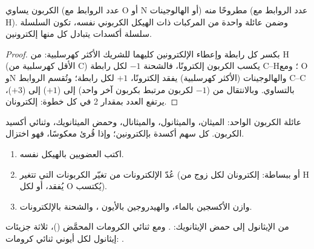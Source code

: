 \begin{proposition}\label{prop:b1:organic-redox:on-of-carbon}
 الكربون يساوي (عدد الروابط مع O أو N أو
الهالوجينات) مطروحًا منه (عدد الروابط مع H). وضمن عائلة واحدة من المركبات
ذات الهيكل الكربوني نفسه، تكون السلسلة  سلسلة أكسدات يتبادل كل منها
إلكترونين.
\end{proposition}

\begin{proof}
بكسر كل رابطة وإعطاء الإلكترونين كليهما للشريك الأكثر
كهرسلبية: من H (الأقل كهرسلبية من C) يكسب الكربون إلكترونًا،
فالشحنة $-1$ لكل رابطة C--H؛ ومع O وN والهالوجينات (الأكثر كهرسلبية) يفقد
إلكترونًا، $+1$ لكل رابطة؛ وتُقسم الروابط C--C بالتساوي. وبالانتقال من 
($-1$ لكربون مرتبط بكربون آخر واحد) إلى  ($+1$) إلى
 ($+3$)، يرتفع العدد بمقدار 2 في كل خطوة: إلكترونان.
\end{proof}

\begin{omfigure}

{\small {} عائلة الكربون الواحد: الميثان، والميثانول،
والميثانال، وحمض الميثانويك، وثنائي أكسيد الكربون. كل سهم أكسدة
بإلكترونين؛ وإذا قُرئ معكوسًا، فهو اختزال.}
\end{omfigure}

\begin{method}\label{met:b1:organic-redox:balance-organic-redox}
\begin{enumerate}
  \item اكتب   العضويين بالهيكل نفسه.
  \item عُدّ الإلكترونات من تغيّر 
        الكربونات التي تتغير (أو ببساطة: إلكترونان لكل زوج من H يُفقد، أو لكل O
        يُكتسب).
  \item وازن الأكسجين بالماء، والهيدروجين بالأيون ، والشحنة
        بالإلكترونات.
\end{enumerate}
من الإيثانول إلى حمض الإيثانويك: .
ومع ثنائي الكرومات المحمَّض ()،
ثلاثة جزيئات إيثانول لكل أيوني ثنائي كرومات:
.
\end{method}


